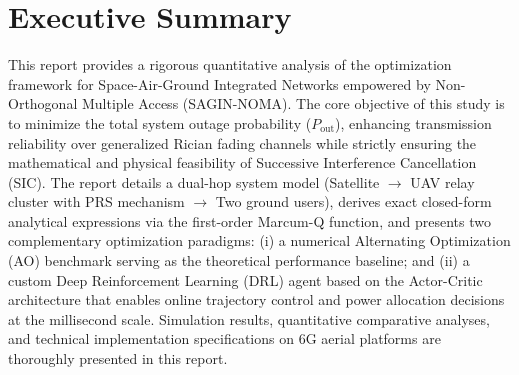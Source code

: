 \section{Executive Summary}
\label{sec:exec_summary}

This report provides a rigorous quantitative analysis of the optimization framework for Space-Air-Ground Integrated Networks empowered by Non-Orthogonal Multiple Access (SAGIN-NOMA). The core objective of this study is to minimize the total system outage probability ($P_{\text{out}}$), enhancing transmission reliability over generalized Rician fading channels while strictly ensuring the mathematical and physical feasibility of Successive Interference Cancellation (SIC). The report details a dual-hop system model (Satellite $\to$ UAV relay cluster with PRS mechanism $\to$ Two ground users), derives exact closed-form analytical expressions via the first-order Marcum-Q function, and presents two complementary optimization paradigms: (i) a numerical Alternating Optimization (AO) benchmark serving as the theoretical performance baseline; and (ii) a custom Deep Reinforcement Learning (DRL) agent based on the Actor-Critic architecture that enables online trajectory control and power allocation decisions at the millisecond scale. Simulation results, quantitative comparative analyses, and technical implementation specifications on 6G aerial platforms are thoroughly presented in this report.
